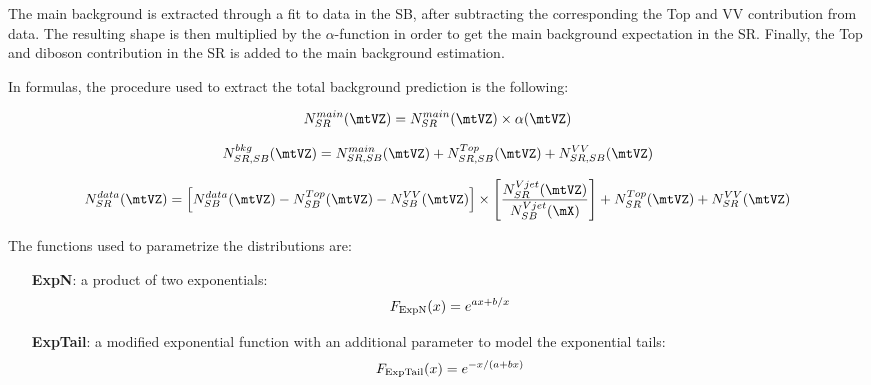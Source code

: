 The main background is extracted through a fit to data in the SB, after subtracting the corresponding the Top and VV contribution from data. The resulting shape is then multiplied by the $\alpha$-function in order to get the main background expectation in the SR. Finally, the Top and diboson contribution in the SR is added to the main background estimation.

In formulas, the procedure used to extract the total background prediction is the following:

$$N_{SR}^{main}(\mtVZ) = N_{SR}^{main}(\mtVZ) \times \alpha(\mtVZ)$$

$$N_{SR,SB}^{bkg}(\mtVZ) = N_{SR,SB}^{main}(\mtVZ) + N_{SR,SB}^{Top}(\mtVZ) + N_{SR,SB}^{VV}(\mtVZ)$$

$$N_{SR}^{data}(\mtVZ) = \left[ N_{SB}^{data}(\mtVZ) - N_{SB}^{Top}(\mtVZ) - N_{SB}^{VV}(\mtVZ) \right] \times \left[ \frac{N_{SR}^{Vjet}(\mtVZ)}{N_{SB}^{Vjet}(\mX)} \right]  + N_{SR}^{Top}(\mtVZ) + N_{SR}^{VV}(\mtVZ) $$

The functions used to parametrize the \mtVZ distributions are:

\begin{itemize}
  \item[{\bf ExpN}:] a product of two exponentials: $$F_{\rm ExpN}(x) = e^{ax+b/x}$$
  \item[{\bf ExpTail}:] a modified exponential function with an additional parameter to model the exponential tails: $$F_{\rm ExpTail}(x) = e^{-x/(a+bx)}$$
\end{itemize}

